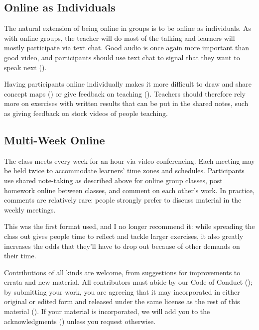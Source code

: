 \subsection*{Online as Individuals}

The natural extension of being online in groups is to be online as individuals.
As with online groups,
the teacher will do most of the talking and learners will mostly participate via text chat.
Good audio is once again more important than good video,
and participants should use text chat to signal that they want to speak next ().

Having participants online individually makes it more difficult to draw and share concept maps ()
or give feedback on teaching ().
Teachers should therefore rely more on exercises with written results that can be put in the shared notes,
such as giving feedback on stock videos of people teaching.

\subsection*{Multi-Week Online}

The class meets every week for an hour via video conferencing.
Each meeting may be held twice to accommodate learners' time zones and schedules.
Participants use shared note-taking as described above for online group classes,
post homework online between classes,
and comment on each other's work.
In practice,
comments are relatively rare:
people strongly prefer to discuss material in the weekly meetings.

This was the first format used,
and I no longer recommend it:
while spreading the class out gives people time to reflect and tackle larger exercises,
it also greatly increases the odds that they'll have to drop out because of other demands on their time.


Contributions of all kinds are welcome,
from suggestions for improvements to errata and new material.
All contributors must abide by our Code of Conduct ();
by submitting your work,
you are agreeing that it may incorporated in either original or edited form
and released under the same license as the rest of this material ().
If your material is incorporated,
we will add you to the acknowledgments () unless you request otherwise.

